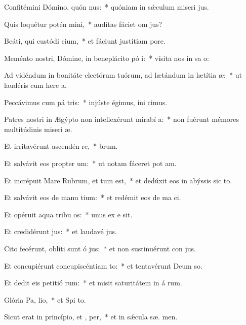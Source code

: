 \item Confitémini Dómino, quón nus:~* quóniam in sǽculum miseri jus.
\item Quis loquétur potén mini,~* audítas fáciet om  jus?
\item Beáti, qui custódi cium,~* et fáciunt justítiam   pore.
\item Meménto nostri, Dómine, in beneplácito pó i:~* vísita nos in sa o:
\item Ad vidéndum in bonitáte electórum tuórum, ad lætándum in lætítia  æ:~* ut laudéris cum here a.
\item Peccávimus cum pá tris:~* injúste égimus, ini cimus.
\item Patres nostri in Ægýpto non intellexérunt mirabí a:~* non fuérunt mémores multitúdinis miseri æ.
\item Et irritavérunt ascendén  re,~*  brum.
\item Et salvávit eos propter  um:~* ut notam fáceret pot am.
\item Et incrépuit Mare Rubrum, et tum est,~* et dedúxit eos in abýssis sic  to.
\item Et salvávit eos de manu tium:~* et redémit eos de ma ci.
\item Et opéruit aqua tribu os:~* unus ex e  sit.
\item Et credidérunt  jus:~* et laudavé  jus.
\item Cito fecérunt, oblíti sunt ó jus:~* et non sustinuérunt con jus.
\item Et concupiérunt concupiscéntiam  to:~* et tentavérunt Deum  so.
\item Et dedit eis petitió rum:~* et misit saturitátem in á rum.
\item Glória Pa,  lio,~* et Spi to.
\item Sicut erat in princípio, et ,  per,~* et in sǽcula sæ. men.
